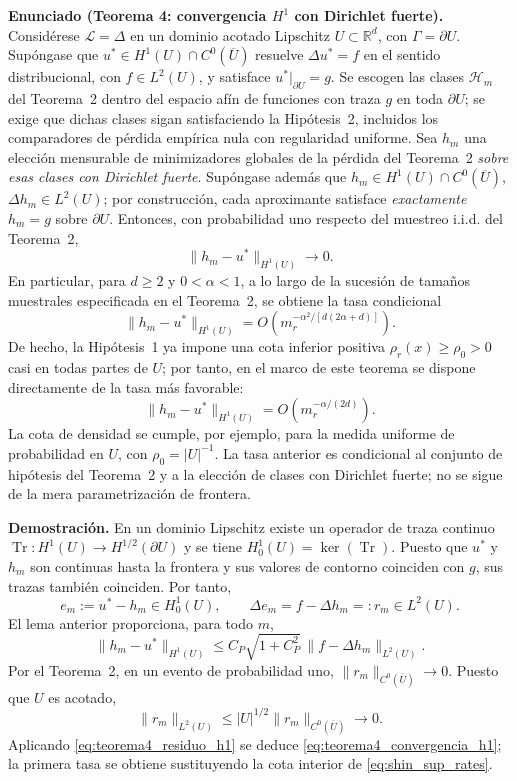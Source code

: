 \medskip
\noindent\textbf{Enunciado (Teorema 4: convergencia $H^1$ con Dirichlet fuerte).}
Considérese $\mathcal L=\Delta$ en un dominio acotado Lipschitz
$U\subset\mathbb R^d$, con $\Gamma=\partial U$. Supóngase que
$u^*\in H^1(U)\cap C^0(\overline U)$ resuelve
$\Delta u^*=f$ en el sentido distribucional, con
$f\in L^2(U)$, y satisface $u^*|_{\partial U}=g$.
Se escogen las clases $\mathcal H_m$ del Teorema~2 dentro del espacio
afín de funciones con traza $g$ en toda $\partial U$; se exige que
dichas clases sigan satisfaciendo la Hipótesis~2, incluidos los
comparadores de pérdida empírica nula con regularidad uniforme.
Sea $h_m$ una elección mensurable de minimizadores globales de la
pérdida del Teorema~2 \emph{sobre esas clases con Dirichlet fuerte}.
Supóngase además que
$h_m\in H^1(U)\cap C^0(\overline U)$,
$\Delta h_m\in L^2(U)$; por construcción, cada aproximante satisface
\emph{exactamente} $h_m=g$ sobre $\partial U$.
Entonces, con probabilidad uno respecto del muestreo i.i.d. del
Teorema~2,
\begin{equation}\label{eq:teorema4_convergencia_h1}
\|h_m-u^*\|_{H^1(U)}\longrightarrow0.
\end{equation}
En particular, para $d\ge2$ y $0<\alpha<1$, a lo largo de la
sucesión de tamaños muestrales especificada en el Teorema~2, se obtiene
la tasa condicional
\begin{equation}\label{eq:teorema4_tasa_h1_general}
\|h_m-u^*\|_{H^1(U)}
=O\!\left(m_r^{-\alpha^2/[d(2\alpha+d)]}\right).
\end{equation}
De hecho, la Hipótesis~1 ya impone una cota inferior positiva
$\rho_r(x)\ge\rho_0>0$ casi en todas partes de $U$; por tanto,
en el marco de este teorema se dispone directamente de la tasa más favorable:
\begin{equation}\label{eq:teorema4_tasa_h1_densidad}
\|h_m-u^*\|_{H^1(U)}=O\!\left(m_r^{-\alpha/(2d)}\right).
\end{equation}
La cota de densidad se cumple, por ejemplo, para la medida
uniforme de probabilidad en $U$, con $\rho_0=|U|^{-1}$.
La tasa anterior es condicional al conjunto de hipótesis del
Teorema~2 y a la elección de clases con Dirichlet fuerte; no se
sigue de la mera parametrización de frontera.

\medskip
\noindent\textbf{Demostración.}
En un dominio Lipschitz existe un operador de traza continuo
$\operatorname{Tr}:H^1(U)\to H^{1/2}(\partial U)$ y se tiene
$H_0^1(U)=\ker(\operatorname{Tr})$. Puesto que $u^*$ y $h_m$
son continuas hasta la frontera y sus valores de contorno coinciden
con $g$, sus trazas también coinciden. Por tanto,
\[
e_m:=u^*-h_m\in H_0^1(U),\qquad
\Delta e_m=f-\Delta h_m=:r_m\in L^2(U).
\]
El lema anterior proporciona, para todo $m$,
\begin{equation}\label{eq:teorema4_residuo_h1}
\|h_m-u^*\|_{H^1(U)}
\le C_P\sqrt{1+C_P^2}\,\|f-\Delta h_m\|_{L^2(U)}.
\end{equation}
Por el Teorema~2, en un evento de probabilidad uno,
$\|r_m\|_{C^0(\overline U)}\to0$. Puesto que $U$ es acotado,
\[
\|r_m\|_{L^2(U)}\le |U|^{1/2}\|r_m\|_{C^0(\overline U)}\to0.
\]
Aplicando \eqref{eq:teorema4_residuo_h1} se deduce
\eqref{eq:teorema4_convergencia_h1}; la primera tasa se obtiene
sustituyendo la cota interior de \eqref{eq:shin_sup_rates}.

